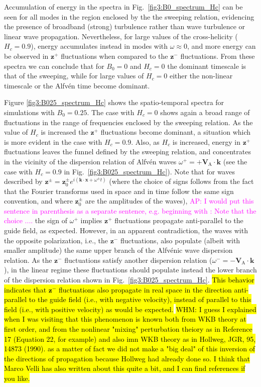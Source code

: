 \documentclass[aip,pop,reprint,amsmath,amssymb,floatfix]{revtex4-1}
\def\AD#1{{\textcolor{magenta}{#1}}}
\def\WHM#1{{\hl{WHM: #1}}}
\renewcommand{\vec}[1]{\mathbf{#1}}
\begin{document}
Accumulation of energy in the spectra in Fig.~\ref{fig3:B0_spectrum_Hc} can be seen for all modes in the region enclosed by the the sweeping relation, evidencing the presence of broadband (strong) turbulence rather than wave turbulence or linear wave propagation. Nevertheless, for large values of the cross-helicity ($H_c = 0.9$), energy accumulates instead in modes with $\omega\approx 0$, and more energy can be observed in $\vec{z}^+$ fluctuations when compared to the $\vec{z}^-$ fluctuations. From these spectra we can conclude that for $B_0=0$ and $H_c=0$ the dominant timescale is that of the sweeping, while for large values of $H_c=0$ either the non-linear timescale or the Alfv\'en time become dominant.

Figure \ref{fig3:B025_spectrum_Hc} shows the spatio-temporal spectra for simulations with $B_0=0.25$. The case with $H_c=0$ shows again a broad range of fluctuations in the range of frequencies enclosed by the sweeping relation. As the value of $H_c$ is increased the $\vec{z}^+$ fluctuations become dominant, a situation which is more evident in the case with $H_c=0.9$. Also, as $H_c$ is increased, energy in $\vec{z}^+$ fluctuations leaves the funnel defined by the sweeping relation, and concentrates in the vicinity of the dispersion relation of Alfv\'en waves $\omega^+ = +\vec{V}_\textrm{A} \cdot \vec{k}$ (see the case with $H_c=0.9$ in Fig.~\ref{fig3:B025_spectrum_Hc}). Note that for waves described by $\vec{z}^\pm={\vec z}_0^\pm e^{i(\vec{k} \cdot \vec{x}+\omega^\pm t)}$ (where the choice of signs follows from the fact that the Fourier transforms used in space and in time follow the same sign convention, and where ${\vec z}_0^\pm$ are the amplitudes of the waves), 
\AD{AP: I would put this sentence in parenthesis as a separate sentence, e.g. beginning with : Note that  the choice ....}
the sign of $\omega^+$ implies $\vec{z}^+$ fluctuations propagate anti-parallel to the guide field, as expected. However, in an apparent contradiction, the waves with the opposite polarization, i.e., the $\vec{z}^-$ fluctuations, also populate (albeit with smaller amplitude) the same upper branch of the Alfv\'enic wave dispersion relation. As the $\vec{z}^-$ fluctuations satisfy another dispersion relation ($\omega^- = -\vec{V}_\textrm{A} \cdot \vec{k}$), in the linear regime these fluctuations should populate instead the lower branch of the dispersion relation shown in Fig.~\ref{fig3:B025_spectrum_Hc}. \hl{This behavior indicates that $\vec{z}^-$ fluctuations also propagate in real space in the direction anti-parallel to the guide field (i.e., with negative velocity), instead of parallel to this field (i.e., with positive velocity) as would be expected.} \WHM{I guess I explained when I was visiting that this phenomenon is known both from WKB theory at first order, and from the nonlinear "mixing" perturbation theiory as in Reference 17 (Equation 22, for example) and also imn WKB theory as in Hollweg, JGR, 95, 14873 (1990). as a matter of fact we did not make a "big deal" of this inversion of the directions of propagation because Hollweg had already done so. I think that Marco Velli has also written about this quite a bit, and I can find references if you like. }
\end{document}
